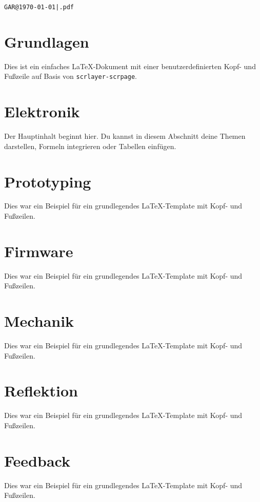 \documentclass[a4paper,12pt]{scrartcl}
\begin{document}
\thispagestyle{empty}
\newpage

\iftableofcontentspage
  \tableofcontents

  \thispagestyle{empty}
  \newpage
\fi

\setcounter{page}{1}

\noindent\hfill\texttt{GAR@\today|\jobname.pdf}
\vspace{-25pt}

\section{Grundlagen}
Dies ist ein einfaches LaTeX-Dokument mit einer benutzerdefinierten Kopf- und Fußzeile auf Basis von \texttt{scrlayer-scrpage}.

\section{Elektronik}
Der Hauptinhalt beginnt hier. Du kannst in diesem Abschnitt deine Themen darstellen, Formeln integrieren oder Tabellen einfügen.

\section{Prototyping}
Dies war ein Beispiel für ein grundlegendes LaTeX-Template mit Kopf- und Fußzeilen.

\section{Firmware}
Dies war ein Beispiel für ein grundlegendes LaTeX-Template mit Kopf- und Fußzeilen.

\section{Mechanik}
Dies war ein Beispiel für ein grundlegendes LaTeX-Template mit Kopf- und Fußzeilen.

\section{Reflektion}
Dies war ein Beispiel für ein grundlegendes LaTeX-Template mit Kopf- und Fußzeilen.

\section{Feedback}
Dies war ein Beispiel für ein grundlegendes LaTeX-Template mit Kopf- und Fußzeilen.
\end{document}
